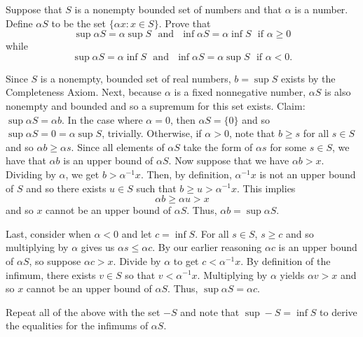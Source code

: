 \documentclass[letterpaper, twoside, 12pt]{book}
\begin{document}
\begin{exercise}[4]
  Suppose that \(S\) is a nonempty bounded set of numbers and that \(\alpha\)
  is a number. Define \(\alpha S\) to be the set \(\{\alpha x:x\in S\}\).
  Prove that
  \[
    \sup\alpha S=\alpha\sup S
      \text{~~and~~}
    \inf\alpha S=\alpha\inf S
      \text{~~if~}
    \alpha\geq 0
  \]
  while
  \[
    \sup\alpha S=\alpha\inf S
      \text{~~and~~}
    \inf\alpha S=\alpha\sup S
      \text{~~if~}
    \alpha< 0
  .\]
\end{exercise}

\begin{solution}
    Since \(S\) is a nonempty, bounded set of real numbers, \(b = \sup S\)
    exists by the Completeness Axiom. Next, because \(\alpha\) is a fixed nonnegative
    number, \(\alpha S\) is also nonempty and bounded and so a supremum for this
    set exists. Claim: \( \sup \alpha S = \alpha b \). In the case where \(\alpha = 0\),
    then \(\alpha S = \{0\}\) and so \(\sup \alpha S = 0 = \alpha \sup S\),
    trivially. Otherwise, if \(\alpha > 0\), note that \(b \geq s \) for all \(s \in S\)
    and so \(\alpha b \geq \alpha s\). Since all elements of \(\alpha S\) take the 
    form of \(\alpha s\) for some \(s \in S\), we have that \(\alpha b\) is an upper 
    bound of \(\alpha S\). Now suppose that we have \(\alpha b > x\). 
    Dividing by \(\alpha\), we get \(b > \alpha^{-1} x \). Then, by definition,
    \(\alpha^{-1} x\) is not an upper bound of \(S\) and so there exists \(u \in S\)
    such that \(b \geq u > \alpha^{-1} x\). This implies
    \[ \alpha b \geq \alpha u > x \]
    and so \(x\) cannot be an upper bound of \(\alpha S\). Thus, \(\alpha b = \sup \alpha S\).

    Last, consider when \(\alpha < 0\) and let \(c = \inf S\). For all \(s \in S\),
    \(s \geq c\) and so multiplying by \(\alpha\) gives us \(\alpha s \leq \alpha c\). 
    By our earlier reasoning \(\alpha c\) is an upper bound of \(\alpha S\), so
    suppose \(\alpha c > x\). Divide by \(\alpha\) to get \(c < \alpha^{-1}x\).
    By definition of the infimum, there exists \(v \in S\) so that
    \(v < \alpha^{-1}x\). Multiplying by \(\alpha\) yields \(\alpha v > x \)
    and so \(x\) cannot be an upper bound of \(\alpha S\). Thus, \(\sup \alpha S = \alpha c\).

    Repeat all of the above with the set \(-S\) and note that \(\sup -S = \inf S\)
    to derive the equalities for the infimums of \(\alpha S\).
\end{solution}
\end{document}
